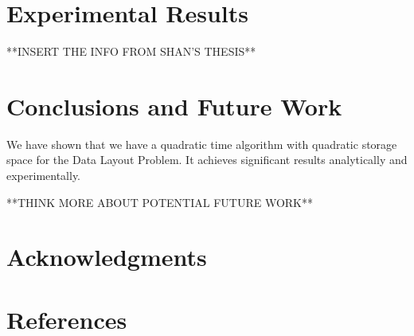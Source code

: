 \documentclass[11pt,psfig]{article}
\begin{document}
\section*{Experimental Results}

**INSERT THE INFO FROM SHAN'S THESIS**

\section*{Conclusions and Future Work}

We have shown that we have a quadratic time algorithm with quadratic storage space for the Data Layout Problem. It achieves significant results analytically and experimentally. 

**THINK MORE ABOUT POTENTIAL FUTURE WORK**

\section*{Acknowledgments}

\section*{References}    

\end{document}
